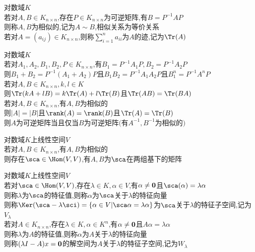 \begin{dingyi}
对数域$K$\\
若对$A,B\in K_{n\times n}$,存在$P\in K_{n\times n}$为可逆矩阵,有$B=P^{-1}AP$\\
则称$A,B$为相似的,记为$A\sim B$,相似关系为等价关系\\
若对$A=(a_{ij})\in K_{n\times n}$,则称$\sum\limits_{i=1}^{n}a_{ii}$为$A$的迹,记为$\Tr(A)$
\end{dingyi}

\begin{dingli}
对数域$K$\\
若对$A_1,A_2,B_1,B_2,P\in K_{n\times n}$,有$B_1=P^{-1}A_1P,B_2=P^{-1}A_2P$\\
则$B_1+B_2=P^{-1}(A_1+A_2)P$且$B_1B_2=P^{-1}A_1A_2P$且$B_1^{n}=P^{-1}A^{n}P$\\
若对$A,B\in K_{n\times n},k,l\in K$\\
则$\Tr(kA+lB)=k\Tr(A)+l\Tr(B)$且$\Tr(AB)=\Tr(BA)$\\
若对$A,B\in K_{n\times n}$,有$A,B$为相似的\\
则$|A|=|B|$且$\rank(A)=\rank(B)$且$\Tr(A)=\Tr(B)$\\
则$A$为可逆矩阵当且仅当$B$为可逆矩阵$($有$A^{-1},B^{-1}$为相似的$)$
\end{dingli}

\begin{dingli}
对数域$K$上线性空间$V$\\
若对$A,B\in K_{n\times n}$,有$A,B$为相似的\\
则存在$\sca\in\Hom(V,V)$,有$A,B$为$\sca$在两组基下的矩阵
\end{dingli}

\begin{dingyi}
对数域$K$上线性空间$V$\\
若对$\sca\in\Hom(V,V)$,存在$\lambda\in K,\alpha\in V$,有$\alpha\neq{\bf0}$且$\sca(\alpha)=\lambda\alpha$\\
则称$\lambda$为$\sca$的特征值,则称$\alpha$为$\sca$关于$\lambda$的特征向量\\
则称$\Ker(\sca-\lambda\sci)=\{\alpha\in V|\sca\alpha=\lambda\alpha\}$为$\sca$关于$\lambda$的特征子空间,记为$V_{\lambda}$\\
若对$A\in K_{n\times n}$,存在$\lambda\in K,\alpha\in K^n$,有$\alpha\neq{\bf0}$且$A\alpha=\lambda\alpha$\\
则称$\lambda$为$A$的特征值,则称$\alpha$为$A$关于$\lambda$的特征向量\\
则称$(\lambda I-A)x={\bf0}$的解空间为$A$关于$\lambda$的特征子空间,记为$W_{\lambda}$
\end{dingyi}

